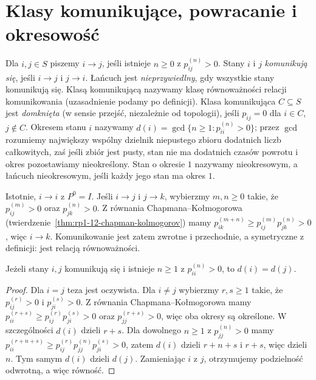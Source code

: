 \section{Klasy komunikujące, powracanie i okresowość}

\begin{definicja}
Dla $i,j\in S$ piszemy $i\to j$, jeśli istnieje
$n\geq0$ z $p_{ij}^{(n)}>0$. Stany $i$ i $j$
\emph{komunikują się}, jeśli $i\to j$ i $j\to i$.
Łańcuch jest \emph{nieprzywiedlny}, gdy wszystkie
stany komunikują się. Klasą komunikującą nazywamy
klasę równoważności relacji komunikowania
(uzasadnienie podamy po definicji).
Klasa komunikująca $C\subseteq S$ jest \emph{domknięta}
(w sensie przejść, niezależnie od topologii), jeśli
$p_{ij}=0$ dla $i\in C$, $j\notin C$. Okresem stanu $i$ nazywamy
$d(i)=\gcd\{n\geq1:p_{ii}^{(n)}>0\}$;
przez $\gcd$ rozumiemy największy wspólny dzielnik
niepustego zbioru dodatnich liczb całkowitych, zaś jeśli zbiór jest pusty,
stan nie ma dodatnich czasów powrotu i okres
pozostawiamy nieokreślony. Stan o okresie $1$
nazywamy nieokresowym, a łańcuch nieokresowym,
jeśli każdy jego stan ma okres $1$.
\end{definicja}

Istotnie, $i\to i$ z $P^0=I$. Jeśli $i\to j$
i $j\to k$, wybierzmy $m,n\geq0$ takie, że
$p_{ij}^{(m)}>0$ oraz $p_{jk}^{(n)}>0$.
Z równania Chapmana--Kołmogorowa
(twierdzenie~\ref{thm:rp1-12-chapman-kolmogorov})
mamy $p_{ik}^{(m+n)}\geq p_{ij}^{(m)}p_{jk}^{(n)}>0$,
więc $i\to k$. Komunikowanie jest zatem zwrotne
i przechodnie, a symetryczne z definicji:
jest relacją równoważności.

\begin{lemat}
Jeżeli stany $i,j$ komunikują się i istnieje
$n\geq1$ z $p_{ii}^{(n)}>0$, to $d(i)=d(j)$.
\end{lemat}
\begin{proof}
Dla $i=j$ teza jest oczywista. Dla $i\ne j$
wybierzmy $r,s\geq1$ takie, że
$p_{ij}^{(r)}>0$ i $p_{ji}^{(s)}>0$.
Z równania Chapmana--Kołmogorowa mamy
$p_{ii}^{(r+s)}\geq p_{ij}^{(r)}p_{ji}^{(s)}>0$
oraz $p_{jj}^{(r+s)}>0$, więc oba okresy są określone.
W szczególności $d(i)$ dzieli $r+s$.
Dla dowolnego $n\geq1$ z $p_{jj}^{(n)}>0$ mamy
$p_{ii}^{(r+n+s)}\geq p_{ij}^{(r)}p_{jj}^{(n)}
p_{ji}^{(s)}>0$, zatem $d(i)$ dzieli $r+n+s$
i $r+s$, więc dzieli $n$.
Tym samym $d(i)$ dzieli $d(j)$.
Zamieniając $i$ z $j$, otrzymujemy podzielność
odwrotną, a więc równość.
\end{proof}

